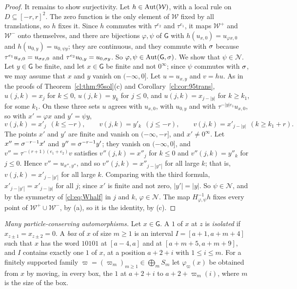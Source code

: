 \begin{proof}
It remains to show surjectivity. Let $h\in\operatorname{Aut}(\mathcal W)$, with a local rule on $D\subseteq[-r,r]^2$. The zero function is the only element of $\mathcal W$ fixed by all translations, so $h$ fixes it. Since $h$ commutes with $\tau^{e_2}$ and $\tau^{e_1}$, it maps $\mathcal W^+$ and $\mathcal W^-$ onto themselves, and there are bijections $\varphi,\psi$ of $\mathsf G$ with $h(u_{x,0})=u_{\varphi x,0}$ and $h(u_{0,y})=u_{0,\psi y}$; they are continuous, and they commute with $\sigma$ because $\tau^{e_1}u_{x,0}=u_{\sigma x,0}$ and $\tau^{e_2}u_{0,y}=u_{0,\sigma y}$. So $\varphi,\psi\in\operatorname{Aut}(\mathsf G,\sigma)$. We show that $\psi\in\mathcal N$. Let $y\in \mathsf G$ be finite, and let $x\in \mathsf G$ be finite and not $0^\infty$; since $\psi$ commutes with $\sigma$, we may assume that $x$ and $y$ vanish on $(-\infty,0]$. Let $u=u_{x,y}$ and $v=hu$. As in the proofs of Theorem~\ref{cl:thm:95sol}(c) and Corollary~\ref{cl:cor:95trans}, $u(j,k)=x_j$ for $k\le0$, $u(j,k)=y_k$ for $j\le0$, and $u(j,k)=x_{j-|y|}$ for $k\ge k_1$, for some $k_1$. On these three sets $u$ agrees with $u_{x,0}$, with $u_{0,y}$ and with $\tau^{-|y|e_1}u_{x,0}$, so with $x'=\varphi x$ and $y'=\psi y$,
\[
v(j,k)=x'_j\ \ (k\le-r),\qquad v(j,k)=y'_k\ \ (j\le-r),\qquad v(j,k)=x'_{j-|y|}\ \ (k\ge k_1+r).
\]
The points $x'$ and $y'$ are finite and vanish on $(-\infty,-r]$, and $x'\ne0^\infty$. Let $x''=\sigma^{-r-1}x'$ and $y''=\sigma^{-r-1}y'$; they vanish on $(-\infty,0]$, and $v''=\tau^{-(r+1)(e_1+e_2)}v$ satisfies $v''(j,k)=x''_j$ for $k\le0$ and $v''(j,k)=y''_k$ for $j\le0$. Hence $v''=u_{x'',y''}$, and so $v''(j,k)=x''_{j-|y''|}$ for all large $k$; that is, $v(j,k)=x'_{j-|y'|}$ for all large $k$. Comparing with the third formula, $x'_{j-|y'|}=x'_{j-|y|}$ for all $j$; since $x'$ is finite and not zero, $|y'|=|y|$. So $\psi\in\mathcal N$, and by the symmetry of \eqref{cl:eq:Whalf} in $j$ and $k$, $\varphi\in\mathcal N$. The map $H_{\varphi,\psi}^{-1}h$ fixes every point of $\mathcal W^+\cup\mathcal W^-$, by (a), so it is the identity, by (c).
\end{proof}

\emph{Many particle-conserving automorphisms.} Let $x\in \mathsf G$. A $1$ of $x$ at $z$ is \emph{isolated} if $x_{z\pm1}=x_{z\pm2}=0$. A \emph{box} of $x$ of size $m\ge1$ is an interval $I=[a+1,a+m+4]$ such that $x$ has the word $10101$ at $[a-4,a]$ and at $[a+m+5,a+m+9]$, and $I$ contains exactly one $1$ of $x$, at a position $a+2+i$ with $1\le i\le m$. For a finitely supported family $\varpi=(\varpi_m)_{m\ge1}\in\bigoplus_mS_m$ let $\varphi_\varpi(x)$ be obtained from $x$ by moving, in every box, the $1$ at $a+2+i$ to $a+2+\varpi_m(i)$, where $m$ is the size of the box.

